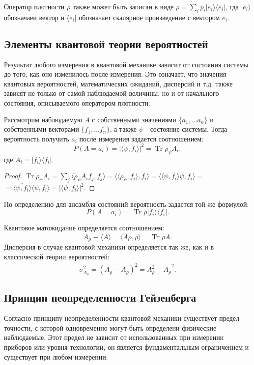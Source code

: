 \documentclass[%
master,         %
subf,           %
href,           %
colorlinks=true %
]{disser}
\DeclareMathOperator{\Tr}{Tr}
\numberwithin{equation}{section}
\numberwithin{figure}{section}
\begin{document}
Оператор плотности $\rho$ также может быть записан в виде $\rho = \sum_i p_i|e_i\rangle\langle e_i|$, гда $|e_i\rangle$ обозначаеи вектор и $\langle e_i|$ обозначает скалярное произведение с вектором $e_i$. 

\subsection{Элементы квантовой теории вероятностей}
Результат любого измерения в квантовой механике зависит от состояния системы до того, как оно изменилось после измерения. Это означает, что значения квантовых вероятностей, математических ожиданий, дисперсий и т.д. также зависят не только от самой наблюдаемой величины, но и от начального состояния, описываемого оператором плотности.

Рассмотрим наблюдаемую $A$ с собственными значениями $\{a_1,\ldots a_n\}$ и собственными векторами $\{f_1,\ldots f_n\}$, а также $\psi$ - состояние системы. Тогда вероятность получить $a_i$ после измерения задается соотношением:
\[
P(A = a_i) = |\langle\psi, f_i\rangle|^2 = \Tr \rho_\psi A_i,
\]
где $A_i = |f_i\rangle \langle f_i|$.
\begin{proof}
$\Tr \rho_\psi A_i = \sum_j \langle\rho_\psi A_if_j, f_j\rangle = \langle \langle\rho_\psi, f_i\rangle, f_i\rangle = \langle \langle \psi, f_i\rangle\psi, f_i\rangle = $\\
$= \overline{\langle\psi, f_i\rangle} \langle\psi, f_i\rangle = |\langle\psi, f_i\rangle|^2.$
\end{proof}
По определению для ансамбля состояний вероятность задается той же формулой:
\[
P(A = a_i) = \Tr \rho |f_i\rangle \langle f_i|.
\]

Квантовое матожидание определяется соотношением:
\[
\overline{A_\rho} \equiv \langle A\rangle = \langle A\rho, \rho\rangle = \Tr\rho A.
\]
Дисперсия в случае квантовой механики определяется так же, как и в классической теории вероятностей:
\[
\sigma^2_{A_\rho} = \overline{\left(A_\rho - \overline{A_\rho}\right)^2} = \overline{A^2_\rho} - \overline{A_\rho}^2.
\] 

\subsection{Принцип неопределенности Гейзенберга}
Согласно принципу неопределенности квантовой механики существует предел точности, с которой одновременно могут быть определени физические наблюдаемые. Этот предел не зависит от использованных при измерении приборов или уровня технологии, он является фундаментальным ограничением и существует при любом измерении.
\end{document}
